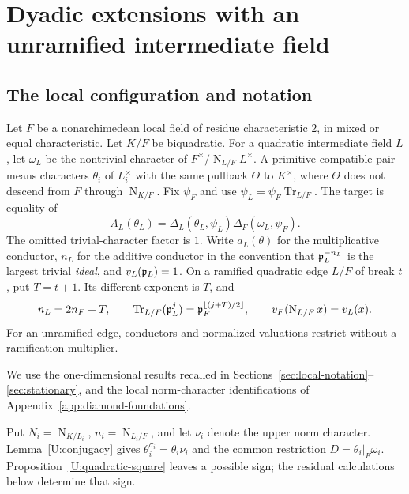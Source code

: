 \documentclass[11pt]{amsart}
\theoremstyle{definition}
\theoremstyle{remark}
\newcommand{\Tr}{\operatorname{Tr}}
\newcommand{\Nm}{\operatorname{N}}
\newcommand{\floor}[1]{\left\lfloor #1\right\rfloor}
\begin{document}
\section{Dyadic extensions with an unramified intermediate field}\label{sec:dyadic-ur}
\subsection{The local configuration and notation}
Let $F$ be a nonarchimedean local field of residue characteristic $2$,
in mixed or equal characteristic. Let $K/F$ be biquadratic. For a quadratic
intermediate field $L$, let $\omega_L$ be the nontrivial character of
$F^\times/\Nm_{L/F}L^\times$. A primitive compatible pair means characters
$\theta_i$ of $L_i^\times$ with the same pullback $\Theta$ to $K^\times$,
where $\Theta$ does not descend from $F$ through $\Nm_{K/F}$.
Fix $\psi_F$ and use $\psi_L=\psi_F\Tr_{L/F}$. The target is equality of
\begin{equation}\label{D:UR:Adef}
 A_L(\theta_L)=\Delta_L(\theta_L,\psi_L)\Delta_F(\omega_L,\psi_F).
\end{equation}
The omitted trivial-character factor is $1$.
Write $a_L(\theta)$ for the multiplicative conductor, $n_L$ for the additive
conductor in the convention that $\mathfrak p_L^{-n_L}$ is the largest trivial
\emph{ideal}, and $v_L(\mathfrak p_L)=1$. On a ramified quadratic edge $L/F$ of
break $t$, put $T=t+1$. Its different exponent is $T$, and
\begin{equation}\label{D:UR:localledger}
 n_L=2n_F+T,\qquad
 \Tr_{L/F}(\pp_L^j)=\pp_F^{\floor{(j+T)/2}},\qquad
 v_F(\Nm_{L/F}x)=v_L(x).
\end{equation}
For an unramified edge, conductors and normalized valuations restrict
without a ramification multiplier.

We use the one-dimensional results recalled in
Sections~\ref{sec:local-notation}--\ref{sec:stationary}, and the local
norm-character identifications of Appendix~\ref{app:diamond-foundations}.

Put $N_i=\Nm_{K/L_i}$, $n_i=\Nm_{L_i/F}$, and let $\nu_i$ denote
the upper norm character. Lemma~\ref{U:conjugacy} gives
$\theta_i^{\sigma_i}=\theta_i\nu_i$ and the common restriction
$D=\theta_i|_F\omega_i$. Proposition~\ref{U:quadratic-square} leaves a
possible sign; the residual calculations below determine that sign.
\end{document}
